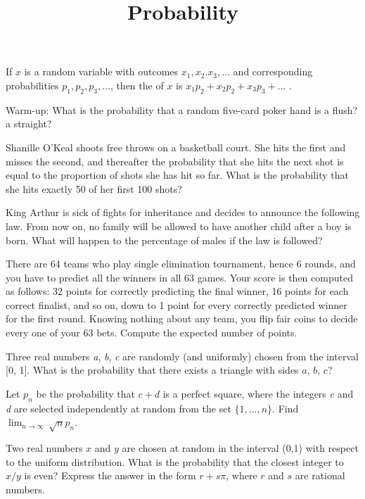 \documentclass{article}
\begin{document}
\title{Probability}
\author{}
\date{}
\maketitle

 { }If \(x\) is a random variable with outcomes \(x_1, x_2. x_3, \ldots\) and corresponding probabilities \(p_1, p_2, p_3,
\ldots\), then the  of \(x\) is \(x_1p_2+ x_2p_2+ x_3p_3+\ldots\) .

Warm-up: { }What is the probability that a random five-card poker hand is a flush? a straight? 

Shanille O{'}Keal shoots free throws on a basketball court. She hits the first and misses the second, and thereafter the probability that she hits
the next shot is equal to the proportion of shots she has hit so far. What is the probability that she hits exactly 50 of her first 100 shots?

King Arthur is sick of fights for inheritance and decides to announce the following law. From now on, no family will be allowed to have another child
after a boy is born. What will happen to the percentage of males if the law is followed?

 There are 64 teams who play single elimination tournament, hence 6 rounds, and you have to predict all the winners in
all 63 games. Your score is then computed as follows: 32 points for correctly predicting the final winner, 16 points for each correct finalist, and
so on, down to 1 point for every correctly predicted winner for the first round. { }Knowing nothing about any team, you flip fair coins to decide
every one of your 63 bets. Compute the expected number of points.

Three real numbers \textit{ a}, \textit{ b}, \textit{ c} are randomly (and uniformly) chosen from the interval [0, 1]. What is the probability that
there exists a triangle with sides \(a\), \(b\), \(c\)?

Let \(p_n\) be the probability that \(c + d\) is a perfect square, where the integers \textit{ c} and \textit{ d} are selected independently at random
from the set \(\{1, . . . , n\}\). { }Find { }\(\lim_{n\to \infty } \, \sqrt{n} p_n\).

Two real numbers \(x\) and \(y\) are chosen at random in the interval (0,1) with respect to the uniform distribution. What is the probability that
the closest integer to \(x/y\) is even? Express the answer in the form \(r + s \pi\), where \(r\) and \(s\) are rational numbers.
\end{document}
